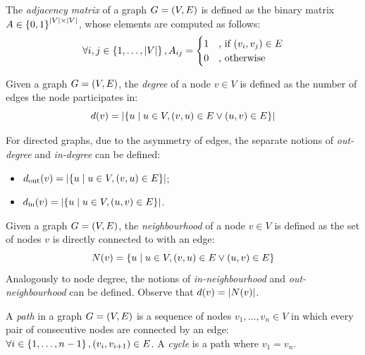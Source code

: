 \begin{definition}
The \emph{adjacency matrix} of a graph $G=\mathopen{}\left(V, E\right)$ is defined as the binary matrix $A \in \mathopen{}\left\{0,1\right\}^{\mathopen{}\left|V\right| \times \mathopen{}\left|V\right|}$, whose elements are computed as follows:
\begin{equation}
\forall i,j \in \mathopen{}\left\{1, \dots, \mathopen{}\left|V\right|\right\}, A_{ij} = \begin{cases}1 &\text{, if }\mathopen{}\left(v_i, v_j\right) \in E \\ 0 & \text{, otherwise} \end{cases}
\end{equation}
\end{definition}

\begin{definition}
Given a graph $G=\mathopen{}\left(V, E\right)$, the \emph{degree} of a node $v \in V$ is defined as the number of edges the node participates in: 
\begin{equation}
d\mathopen{}\left(v\right) = \mathopen{}\left|\mathopen{}\left\{u \mid u \in V, \mathopen{}\left(v, u\right) \in E \vee \mathopen{}\left(u, v\right) \in E \right\}\right|
\end{equation}

For directed graphs, due to the asymmetry of edges, the separate notions of \emph{out-degree} and \emph{in-degree} can be defined:
\begin{itemize}
\item $d_{\text{out}}\mathopen{}\left(v\right) = \mathopen{}\left|\mathopen{}\left\{u \mid u \in V, \mathopen{}\left(v, u\right) \in E \right\}\right|$;
\item $d_{\text{in}}\mathopen{}\left(v\right) = \mathopen{}\left|\mathopen{}\left\{u \mid u \in V, \mathopen{}\left(u, v\right) \in E \right\}\right|$.
\end{itemize}
\end{definition}

\begin{definition}
Given a graph $G=\mathopen{}\left(V, E\right)$, the \emph{neighbourhood} of a node $v \in V$ is defined as the set of nodes $v$ is directly connected to with an edge: \begin{equation}
N\mathopen{}\left(v\right)=\mathopen{}\left\{u \mid u\in V, \mathopen{}\left(v,u\right) \in E \vee \mathopen{}\left(u,v\right) \in E \right\}
\end{equation} 
Analogously to node degree, the notions of \emph{in-neighbourhood} and \emph{out-neighbourhood} can be defined. Observe that $d\mathopen{}\left(v\right)=\mathopen{}\left|N\mathopen{}\left(v\right)\right|$.
\end{definition}

\begin{definition}
A \emph{path} in a graph $G=\mathopen{}\left(V, E\right)$ is a sequence of nodes $v_1,\dots,v_n \in V$ in which every pair of consecutive nodes are connected by an edge: $\forall i \in \mathopen{}\left\{1,\dots,n-1\right\},\mathopen{}\left(v_i,v_{i+1}\right)\in E$. A \emph{cycle} is a path where $v_1=v_n$.
\end{definition}

